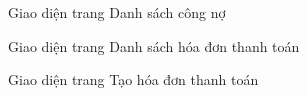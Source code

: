 \begin{figure}[H]
    \begin{center}
        \caption{Giao diện trang Danh sách công nợ}
        \label{result_danh_sach_cong_no}
    \end{center}
\end{figure}

\begin{figure}[H]
    \begin{center}
        \caption{Giao diện trang Danh sách hóa đơn thanh toán}
        \label{result_danh_sach_hoa_don_thanh_toan}
    \end{center}
\end{figure}

\begin{figure}[H]
    \begin{center}
        \caption{Giao diện trang Tạo hóa đơn thanh toán}
        \label{result_tao_hoa_don_thanh_toan}
    \end{center}
\end{figure}

